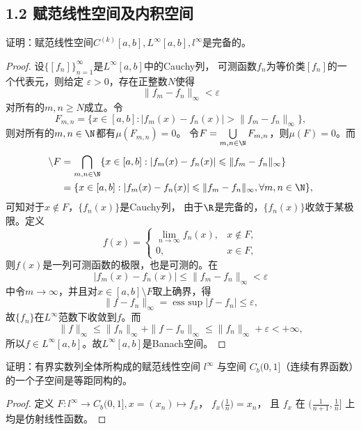 \subsection{1.2 赋范线性空间及内积空间}
\begin{4}
    证明：赋范线性空间$C^{(k)}[a,b],L^\infty [a,b],l^\infty$是完备的。
\end{4}
\begin{proof}
    设$\{[f_n]\}_{n=1}^{\infty}$是$L^\infty[a,b]$中的Cauchy列，
    可测函数$f_n$为等价类$[f_n]$的一个代表元，则给定 $\varepsilon>0$，存在正整数$N$使得 
    $$\|f_m-f_n\|_\infty<\varepsilon$$
    对所有的$m,n\geqslant N$成立。令
    $$F_{m,n}=\{x\in[a,b]:|f_m(x)-f_n(x)|>\|f_m-f_n\|_{\infty}\},$$
    则对所有的$m,n\in\N$都有$\mu(F_{m,n})=0$。
    令$F=\bigcup\limits_{m,n\in\N} F_{m,n}$，则$\mu(F)=0$。而
    \begin{align*}
        [a,b] \setminus F & = \bigcap_{m,n\in\N} \{x\in[a,b]:
        |f_m(x)-f_n(x)|\leqslant\|f_m-f_n\|_{\infty}\} \\
        & = \{x\in[a,b]:
        |f_m(x)-f_n(x)|\leqslant\|f_m-f_n\|_{\infty},\forall m,n\in\N\},
    \end{align*}
    可知对于$x \notin F$，$\{f_n(x)\}$是Cauchy列，
    由于$\R$是完备的，$\{f_n(x)\}$收敛于某极限。定义
    $$f(x)=\begin{cases}
        \lim\limits_{n\to\infty}f_n(x),&x \notin F, \\
        0,&x\in F,
    \end{cases}$$
    则$f(x)$是一列可测函数的极限，也是可测的。在
    $$|f_m(x)-f_n(x)|\leqslant\|f_m-f_n\|_{\infty}<\varepsilon$$
    中令$m\rightarrow\infty$，并且对$x \in [a,b] \setminus F$取上确界，得
    $$\|f-f_n\|_{\infty}=\operatorname{ess\ sup}|f-f_n|\leqslant\varepsilon,$$
    故$\{f_n\}$在$L^\infty$范数下收敛到$f$。而
    $$\|f\|_\infty\leqslant\|f_n\|_\infty+\|f-f_n\|_\infty
    \leqslant\|f_n\|_\infty+\varepsilon<+\infty,$$
    所以$f\in L^\infty[a,b]$。故$L^\infty[a,b]$是Banach空间。
\end{proof}

\begin{7}
    证明：有界实数列全体所构成的赋范线性空间 $l^\infty$ 
    与空间 $C_b(0,1]$（连续有界函数）的一个子空间是等距同构的。
\end{7}
\begin{proof}
    定义 $F\colon l^\infty \to C_b(0,1],x=(x_n) \mapsto f_x$，
    $f_x\big(\frac{1}{n}\big)=x_n$，
    且 $f_x$ 在 $\big(\frac{1}{n+1},\frac{1}{n}\big]$ 上均是仿射线性函数。
\end{proof}


